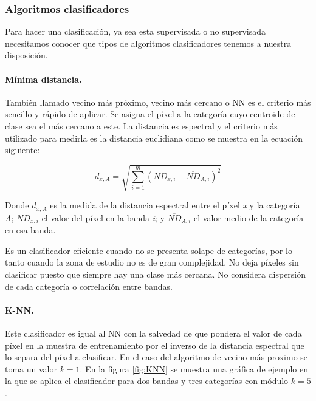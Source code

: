 \subsubsection{Algoritmos clasificadores}
Para hacer una clasificación, ya sea esta supervisada o no supervisada necesitamos conocer que tipos de algoritmos clasificadores tenemos a nuestra disposición.

\paragraph{Mínima distancia.}
También llamado vecino más próximo, vecino más cercano o \ac{NN} es el criterio más sencillo y rápido de aplicar. Se asigna el píxel a la categoría cuyo centroide de clase sea el más cercano a este.  La distancia es espectral y el criterio más utilizado para medirla es la distancia euclidiana como se muestra en la ecuación siguiente:

\begin{equation}
d_{x,A}=\sqrt{\displaystyle\sum_{i=1}^{m}(ND_{x,i}-\overline{ND}_{A,i})^{2}}
\end{equation}\Sep

Donde $d_{x,A}$ es la medida de la distancia espectral entre el píxel \textit{x} y la categoría \textit{A}; $ND_{x,i}$ el valor del píxel en la banda \textit{i}; y $\overline{ND}_{A,i}$ el valor medio de la categoría en esa banda.\Sep

Es un clasificador eficiente cuando no se presenta solape de categorías, por lo tanto cuando la zona de estudio no es de gran complejidad. No deja píxeles sin clasificar puesto que siempre hay una clase más cercana. No considera dispersión de cada categoría o correlación entre bandas.

\paragraph{\ac{K-NN}.}
Este clasificador es igual al \ac{NN} con la salvedad de que pondera el valor de cada píxel en la muestra de entrenamiento por el inverso de la distancia espectral que lo separa del píxel a clasificar. En el caso del algoritmo de vecino más proximo se toma un valor $k=1$. En la figura \ref{fig:KNN} se muestra una gráfica de ejemplo en la que se aplica el clasificador para dos bandas y tres categorías con módulo $k=5$.


